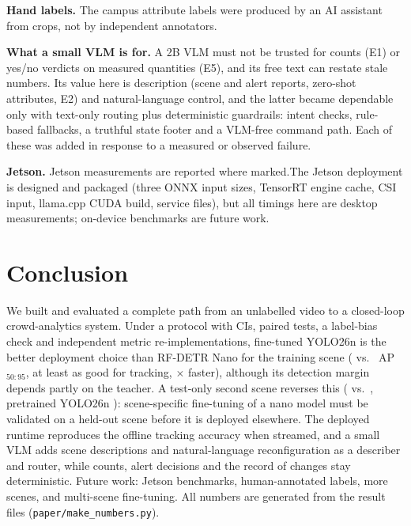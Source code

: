 \documentclass[conference]{IEEEtran}
\newcommand{\AP}{AP$_{50:95}$}
\newcommand{\yolo}{YOLO26n}
\newcommand{\rfdetr}{RF-DETR Nano}
\begin{document}
\textbf{Hand labels.} The campus attribute labels were produced by an AI assistant from crops, not by
independent annotators.

\textbf{What a small VLM is for.} A 2B VLM must not be trusted for counts (E1) or yes/no verdicts on measured
quantities (E5), and its free text can restate stale numbers. Its value here is description (scene and alert
reports, zero-shot attributes, E2) and natural-language control, and the latter became dependable only with
text-only routing plus deterministic guardrails: intent checks, rule-based fallbacks, a truthful state footer
and a VLM-free command path. Each of these was added in response to a measured or observed failure.

\textbf{Jetson.} \ifHaveJetson Jetson measurements are reported where marked.\else The Jetson deployment is
designed and packaged (three ONNX input sizes, TensorRT engine cache, CSI input, llama.cpp CUDA build, service
files), but all timings here are desktop measurements; on-device benchmarks are future work.\fi

\section{Conclusion}
We built and evaluated a complete path from an unlabelled video to a closed-loop crowd-analytics system. Under a
protocol with CIs, paired tests, a label-bias check and independent metric re-implementations, fine-tuned \yolo{}
is the better deployment choice than \rfdetr{} for the training scene (\ApYoloFt{} vs.\ \ApRfFt{} \AP, at least as
good for tracking, \LatRatio$\times$ faster), although its detection margin depends partly on the teacher. A test-only
second scene reverses this (\HoApYoloFt{} vs.\ \HoApRfFt, pretrained \yolo{} \HoApYoloPt): scene-specific
fine-tuning of a nano model must be validated on a held-out scene before it is deployed elsewhere. The deployed runtime
reproduces the offline tracking accuracy when streamed, and a small VLM adds scene descriptions and
natural-language reconfiguration as a describer and router, while counts, alert decisions and the record of
changes stay deterministic. Future work: Jetson benchmarks, human-annotated labels, more scenes, and multi-scene fine-tuning. All numbers are
generated from the result files (\texttt{paper/make\_numbers.py}).



\end{document}
